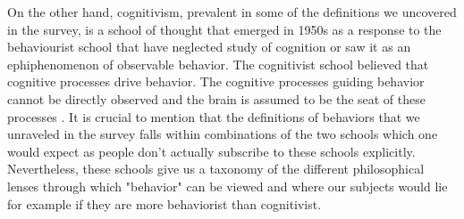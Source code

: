 \documentclass[a4paper, 11pt]{article}
\begin{document}
On the other hand, cognitivism, prevalent in some of the definitions we uncovered in the survey, is a school of thought that emerged in 1950s as a response to the behaviourist school that have neglected study of cognition or saw it as an ephiphenomenon of observable behavior. The cognitivist school believed that cognitive processes drive behavior. The cognitive processes guiding behavior cannot be directly observed and the brain is assumed to be the seat of these processes \cite{schnaitter1987behaviorism}. It is crucial to mention that the definitions of behaviors that we unraveled in the survey falls within combinations of the two schools which one would expect as people don't actually subscribe to these schools explicitly. Nevertheless, these schools give us a taxonomy of the different philosophical lenses through which "behavior" can be viewed and where our subjects would lie for example if they are more behaviorist than cognitivist. 





\end{document}
